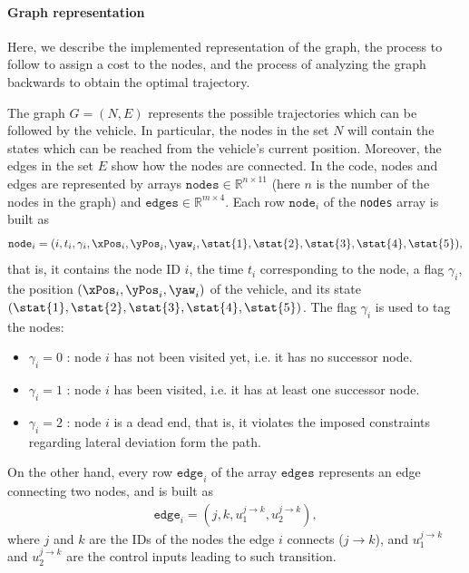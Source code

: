 	\paragraph{Graph representation}
		Here, we describe the implemented representation of the graph, the process to follow to assign a cost to the nodes, and the process of analyzing the graph backwards to obtain the optimal trajectory.
		\par
		The graph %
		$G = (N, E)$ %
		represents the possible trajectories which can be followed by the vehicle. In particular, the nodes in the set %
		$N$ %
		will contain the states which can be reached from the vehicle's current position. 
		Moreover, the edges in the set %
		$E$ %
		show how the nodes are connected. 
		In the code, nodes and edges are represented by arrays %
		$\texttt{nodes}\in\mathbb{R}^{n\times11}$ %
		(here %
		$n$ %
		is the number of the nodes in the graph) and %
		$\texttt{edges}\in\mathbb{R}^{m\times4}$.
		Each row %
		$\texttt{node}_i$ %
		of the \texttt{nodes} array is built as 
		\begin{align}
			\texttt{node}_i = (i, t_i, \gamma_i, {\xPos}_i, {\yPos}_i, {\yaw}_i, \stat{1}, \stat{2}, \stat{3}, \stat{4}, \stat{5}), 
		\end{align}
		that is, it contains the node ID %
		$i$, %
		the time %
		$t_i$ %
		corresponding to the node, a flag %
		$\gamma_i$, %
		the position %
		$({\xPos}_i, {\yPos}_i, {\yaw}_i)$ %
		of the vehicle, and its state %
		$(\stat{1}, \stat{2}, \stat{3}, \stat{4}, \stat{5})$.
		The flag %
		$\gamma_i$ %
		is used to tag the nodes:
		\begin{itemize}
			\item $\gamma_i = 0$ : node $i$ has not been visited yet, i.e. it has no successor node. 
			\item $\gamma_i = 1$ : node $i$ has been visited, i.e. it has at least one successor node. 
			\item $\gamma_i = 2$ : node $i$ is a dead end, that is, it violates the imposed constraints regarding lateral deviation form the path.
		\end{itemize}
		On the other hand, every row %
		$\texttt{edge}_i$ %
		of the array %
		$\texttt{edges}$ %
		represents an edge connecting two nodes, and is built as
		\begin{align}
			\texttt{edge}_i = (j, k, u_1^{j\to k}, u_2^{j\to k}),
		\end{align}
		where $j$ and $k$ are the IDs of the nodes the edge $i$ connects ($j\to k$), and $u_1^{j\to k}$ and $u_2^{j\to k}$ are the control inputs leading to such transition. 
